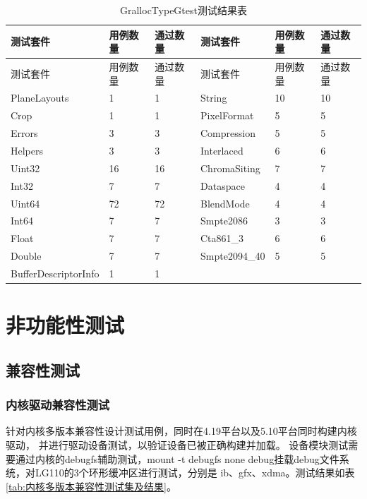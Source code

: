 \begin{longtable}[H]{llllll}
    \caption{GrallocTypeGtest测试结果表}\label{tab:GrallocTypeGtest测试结果表}\\
    \hline
    测试套件 & 用例数量 &通过数量 & 测试套件 & 用例数量 &通过数量\\
    \hline
    \endfirsthead
    \hline
    测试套件 & 用例数量 &通过数量 & 测试套件 & 用例数量 &通过数量\\
    \hline
    \endhead
    PlaneLayouts & 1 & 1 & String & 10 & 10 \\
    Crop & 1 & 1 & PixelFormat & 5 & 5 \\
    Errors & 3 & 3 & Compression & 5 & 5 \\
    Helpers & 3 & 3 & Interlaced & 6 & 6 \\
    Uint32 & 16 & 16 & ChromaSiting & 7 & 7 \\
    Int32 & 7 & 7 & Dataspace & 4 & 4 \\
    Uint64 & 72 & 72 & BlendMode & 4 & 4 \\
    Int64 & 7 & 7 & Smpte2086 & 3 & 3 \\
    Float & 7 & 7 & Cta861\_3 & 6 & 6 \\
    Double & 7 & 7 & Smpte2094\_40 & 5 & 5 \\
    BufferDescriptorInfo & 1 & 1 \\
    \hline
\end{longtable}

\section{非功能性测试}

\subsection{兼容性测试}

\subsubsection{内核驱动兼容性测试}
针对内核多版本兼容性设计测试用例，同时在4.19平台以及5.10平台同时构建内核驱动，
并进行驱动设备测试，以验证设备已被正确构建并加载。
设备模块测试需要通过内核的debugfs辅助测试，mount -t debugfs none debug挂载debug文件系统，对LG110的3个环形缓冲区进行测试，分别是
ib、gfx、xdma。测试结果如表\ref{tab:内核多版本兼容性测试集及结果}。



